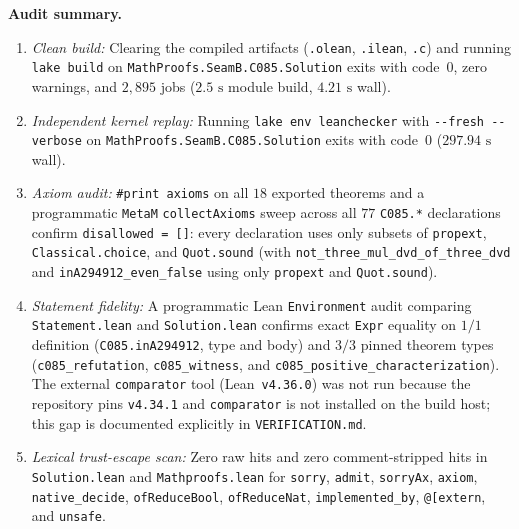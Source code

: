 \documentclass[11pt]{article}
\theoremstyle{definition}
\begin{document}
\noindent\textbf{Audit summary.}
\begin{enumerate}\setlength{\itemsep}{2pt}
\item \emph{Clean build:} Clearing the compiled artifacts (\texttt{.olean}, \texttt{.ilean}, \texttt{.c}) and running \texttt{lake build} on \nolinkurl{MathProofs.SeamB.C085.Solution} exits with code~$0$, zero warnings, and $2{,}895$ jobs ($2.5\text{ s}$ module build, $4.21\text{ s}$ wall).
\item \emph{Independent kernel replay:} Running \texttt{lake env leanchecker} with \texttt{-{}-fresh -{}-verbose} on \nolinkurl{MathProofs.SeamB.C085.Solution} exits with code~$0$ ($297.94\text{ s}$ wall).
\item \emph{Axiom audit:} \texttt{\#print axioms} on all $18$ exported theorems and a programmatic \texttt{MetaM} \texttt{collectAxioms} sweep across all $77$ \texttt{C085.*} declarations confirm \texttt{disallowed = []}: every declaration uses only subsets of \texttt{propext}, \texttt{Classical.choice}, and \texttt{Quot.sound} (with \nolinkurl{not_three_mul_dvd_of_three_dvd} and \nolinkurl{inA294912_even_false} using only \texttt{propext} and \texttt{Quot.sound}).
\item \emph{Statement fidelity:} A programmatic Lean \texttt{Environment} audit comparing \texttt{Statement.lean} and \texttt{Solution.lean} confirms exact \texttt{Expr} equality on $1/1$ definition (\texttt{C085.inA294912}, type and body) and $3/3$ pinned theorem types (\texttt{c085\_refutation}, \texttt{c085\_witness}, and \texttt{c085\_positive\_}\allowbreak\texttt{characterization}). The external \texttt{comparator} tool (Lean~\texttt{v4.36.0}) was not run because the repository pins \texttt{v4.34.1} and \texttt{comparator} is not installed on the build host; this gap is documented explicitly in \texttt{VERIFICATION.md}.
\item \emph{Lexical trust-escape scan:} Zero raw hits and zero comment-stripped hits in \texttt{Solution.lean} and \texttt{Mathproofs.lean} for \texttt{sorry}, \texttt{admit}, \texttt{sorryAx}, \texttt{axiom}, \texttt{native\_decide}, \texttt{ofReduceBool}, \texttt{ofReduceNat}, \texttt{implemented\_by}, \texttt{@[extern}, and \texttt{unsafe}.
\end{enumerate}
\end{document}

